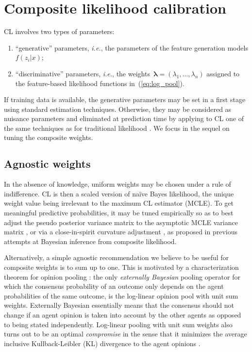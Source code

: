 \documentclass[english]{scrartcl}
\newcommand{\blambda}{{\boldsymbol{\lambda}}}
\begin{document}
\section{Composite likelihood calibration}
\label{sec:calibration}

CL involves two types of parameters:
\begin{enumerate}
    \item ``generative'' parameters, {\em i.e.}, the parameters of the feature generation models $f(z_i|x)$; 
    \item ``discriminative'' parameters, {\em i.e.},  the weights~$\blambda=(\lambda_1,\ldots,\lambda_n)$ assigned to the feature-based likelihood functions in~(\ref{eq:log_pool}).
\end{enumerate}

If training data is available, the generative parameters may be set in a first stage using standard estimation techniques. Otherwise, they may be considered as nuisance parameters and eliminated at prediction time by applying to CL one of the same techniques as for traditional likelihood \cite{Berger-99}. We focus in the sequel on tuning the composite weights.


\subsection{Agnostic weights}

In the absence of knowledge, uniform weights may be chosen under a rule of indifference. CL is then a scaled version of na\"ive Bayes likelihood, the unique weight value being irrelevant to the maximum CL estimator (MCLE). To get meaningful predictive probabilities, it may be tuned empirically so as to best adjust the pseudo posterior variance matrix to the asymptotic MCLE variance matrix \cite{Pauli-11}, or via a close-in-spirit curvature adjustment \cite{Ribatet-12}, as proposed in previous attempts at Bayesian inference from composite likelihood. 

Alternatively, a simple agnostic recommendation we believe to be useful for composite weights is to sum up to one. This is motivated by a characterization theorem for opinion pooling \cite{Genest-86,Genest-86b}: the only {\em externally Bayesian} pooling operator for which the consensus probability of an outcome only depends on the agent probabilities of the same outcome, is the log-linear opinion pool with unit sum weights. Externally Bayesian essentially means that the consensus should not change if an agent opinion is taken into account by the other agents as opposed to being stated independently. Log-linear pooling with unit sum weights also turns out to be an optimal {\em compromise} in the sense that it minimizes the average inclusive Kullback-Leibler (KL) divergence to the agent opinions \cite{Garg-04}. 
\end{document}
